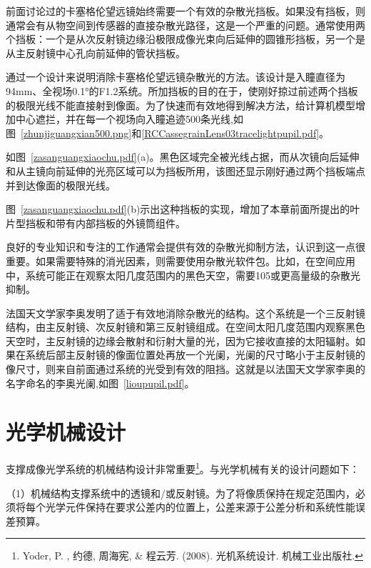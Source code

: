 前面讨论过的卡塞格伦望远镜始终需要一个有效的杂散光挡板。如果没有挡板，则通常会有从物空间到传感器的直接杂散光路径，这是一个严重的问题。通常使用两个挡板：一个是从次反射镜边缘沿极限成像光束向后延伸的圆锥形挡板，另一个是从主反射镜中心孔向前延伸的管状挡板。

通过一个设计来说明消除卡塞格伦望远镜杂散光的方法。该设计是入瞳直径为94mm、全视场0.1°的F1.2系统。所加挡板的目的在于，使刚好掠过前述两个挡板的极限光线不能直接射到像面。为了快速而有效地得到解决方法，给计算机模型增加中心遮拦，并在每一个视场向入瞳追迹500条光线,如图~\ref{zhunjiguangxian500.png}和\ref{RCCassegrainLens03tracelightpupil.pdf}。


如图~\ref{zasanguangxiaochu.pdf}(a)。黑色区域完全被光线占据，而从次镜向后延伸和从主镜向前延伸的光亮区域可以为挡板所用，该图还显示刚好通过两个挡板端点并到达像面的极限光线。

图~\ref{zasanguangxiaochu.pdf}(b)示出这种挡板的实现，增加了本章前面所提出的叶片型挡板和带有内部挡板的外镜筒组件。

良好的专业知识和专注的工作通常会提供有效的杂散光抑制方法，认识到这一点很重要。如果需要特殊的消光因素，则需要使用杂散光软件包。比如，在空间应用中，系统可能正在观察太阳几度范围内的黑色天空，需要105或更高量级的杂散光抑制。

法国天文学家李奥发明了适于有效地消除杂散光的结构。这个系统是一个三反射镜结构，由主反射镜、次反射镜和第三反射镜组成。在空间太阳几度范围内观察黑色天空时，主反射镜的边缘会散射和衍射大量的光，因为它接收直接的太阳辐射。如果在系统后部主反射镜的像面位置处再放一个光阑，光阑的尺寸略小于主反射镜的像尺寸，则来自前面通过系统的光受到有效的阻挡。这就是以法国天文学家李奥的名字命名的李奥光阑,如图~\ref{lioupupil.pdf}。



\section{光学机械设计}
支撑成像光学系统的机械结构设计非常重要\citep{Yoder.2006}\footnote{ Yoder, P. , 约德, 周海宪, \& 程云芳. (2008). 光机系统设计. 机械工业出版社.}。与光学机械有关的设计问题如下：

（1）机械结构支撑系统中的透镜和/或反射镜。为了将像质保持在规定范围内，必须将每个光学元件保持在要求公差内的位置上，公差来源于公差分析和系统性能误差预算。

